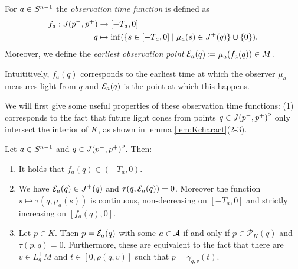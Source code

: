 \begin{definition}\label{def:observationtime}
For $a\in {S^{n-1}}$ the \emph{observation time function} 
is defined as 
\begin{align*}
    f_a:J(p^-,p^+)&\to [-T_a,0]\\
    q&\mapsto\inf(\{s\in [-T_a,0] \mid \mu_a(s)\in J^+(q)\}\cup \{0\}).
\end{align*}
Moreover, we define the \emph{earliest observation point} ${\mathcal{E}}_a(q)\coloneqq\mu_a(f_a(q))\in M$. 

Intuititively, $f_a(q)$ corresponds to the earliest time at which the observer $\mu_a$ measures light from $q$ and ${\mathcal{E}}_a(q)$ is the point at which this happens.
\end{definition}

We will first give some useful properties of these observation time functions: (1) corresponds to the fact that future light cones from points $q\in {\kern0ptJ(p^-,p^+)}^{\mathrm{o}}$ only intersect the interior of $K$, as shown in lemma \ref{lem:Kcharact}(2-3).
\begin{lemma}\label{lem:observationtime}
Let $a\in {S^{n-1}}$ and $q \in {\kern0ptJ(p^-,p^+)}^{\mathrm{o}}$. Then:
\begin{enumerate}[label={\textnormal{(\arabic*)}}]
    \item It holds that $f_a(q)\in (-T_a,0)$.
    \item We have ${\mathcal{E}}_a(q)\in J^+(q)$ and $\tau(q,{\mathcal{E}}_a(q))=0$. Moreover the function $s\mapsto\tau(q,\mu_a(s))$ is continuous, non-decreasing on $[-T_a,0]$ and strictly increasing on $[f_a(q),0]$.
    \item Let $p\in K$. Then $p={\mathcal{E}}_a(q)$ with some $a\in \mathcal{A}$ if and only if $p\in \mathcal{P}_K(q)$ and $\tau(p,q)=0$. Furthermore, these are equivalent to the fact that there are $v\in L^+_qM$ and $t\in[0,\rho(q,v)]$ such that $p=\gamma_{q,v}(t)$.
\end{enumerate}
\end{lemma}
